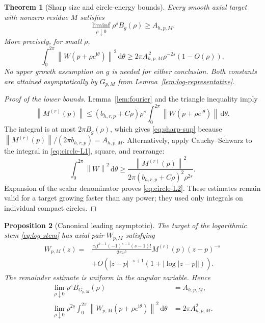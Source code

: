 \documentclass[11pt,a4paper]{article}
\numberwithin{equation}{section}
\newtheorem{theorem}{Theorem}[section]
\newtheorem{proposition}[theorem]{Proposition}
\theoremstyle{definition}
\theoremstyle{remark}
\newcommand{\ii}{\mathrm i}
\newcommand{\dd}{\,\mathrm d}
\newcommand{\norm}[1]{\left\lVert#1\right\rVert}
\begin{document}
\begin{theorem}[Sharp size and circle-energy bounds]\label{thm:sharp-size}
Every smooth axial target with nonzero residue $M$ satisfies
\begin{equation}\label{eq:sharp-sup}
 \liminf_{\rho\downarrow0}\rho^s B_g(\rho)\ge A_{h,p,M}.
\end{equation}
More precisely, for small $\rho$,
\begin{equation}\label{eq:circle-L2}
 \int_0^{2\pi}\norm{W(p+\rho e^{\ii\theta})}^2\dd\theta
 \ge 2\pi A_{h,p,M}^{\,2}\rho^{-2s}(1-O(\rho)).
\end{equation}
No upper growth assumption on $g$ is needed for either conclusion.
Both constants are attained asymptotically by $G_{p,M}$ from
Lemma~\ref{lem:log-representative}.
\end{theorem}

\begin{proof}[Proof of the lower bounds]
Lemma~\ref{lem:fourier} and the triangle inequality imply
\begin{equation}\label{eq:circle-L1}
 \norm{M^{(r)}(p)}
 \le(b_{h,r,p}+C\rho)\rho^s
 \int_0^{2\pi}\norm{W(p+\rho e^{\ii\theta})}\dd\theta.
\end{equation}
The integral is at most $2\pi B_g(\rho)$, which gives
\eqref{eq:sharp-sup} because
$\norm{M^{(r)}(p)}/(2\pi b_{h,r,p})=A_{h,p,M}$.
Alternatively, apply Cauchy--Schwarz to the integral in
\eqref{eq:circle-L1}, square, and rearrange:
\[
 \int_0^{2\pi}\norm W^2\dd\theta
 \ge\frac{\norm{M^{(r)}(p)}^2}
 {2\pi(b_{h,r,p}+C\rho)^2\rho^{2s}}.
\]
Expansion of the scalar denominator proves \eqref{eq:circle-L2}.
These estimates remain valid for a target growing faster than any power;
they used only integrals on individual compact circles.
\end{proof}

\begin{proposition}[Canonical leading asymptotic]\label{prop:canonical-asymptotic}
The target of the logarithmic stem \eqref{eq:log-stem} has axial pair
$W_{p,M}$ satisfying
\begin{equation}\label{eq:canonical-leading}
\begin{split}
 W_{p,M}(z)={}&
 \frac{c_h\ii^{h-1}(-1)^{s-1}(s-1)!}{2\pi v^h}
 M^{(r)}(p)(z-p)^{-s}\\
 &+O\!\left(|z-p|^{-s+1}(1+|\log|z-p||)\right).
\end{split}
\end{equation}
The remainder estimate is uniform in the angular variable. Hence
\begin{align}
 \lim_{\rho\downarrow0}\rho^sB_{G_{p,M}}(\rho)&=A_{h,p,M},
 \label{eq:canonical-sup}\\
 \lim_{\rho\downarrow0}\rho^{2s}\int_0^{2\pi}
 \norm{W_{p,M}(p+\rho e^{\ii\theta})}^2\dd\theta
 &=2\pi A_{h,p,M}^2.\label{eq:canonical-circle}
\end{align}
\end{proposition}
\end{document}
